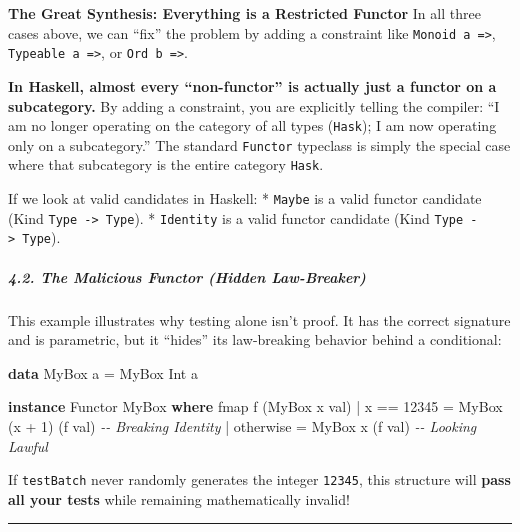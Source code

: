 \documentclass[
]{article}
\newenvironment{Shaded}{}{}
\newcommand{\CommentTok}[1]{\textcolor[rgb]{0.38,0.63,0.69}{\textit{#1}}}
\newcommand{\DataTypeTok}[1]{\textcolor[rgb]{0.56,0.13,0.00}{#1}}
\newcommand{\DecValTok}[1]{\textcolor[rgb]{0.25,0.63,0.44}{#1}}
\newcommand{\FunctionTok}[1]{\textcolor[rgb]{0.02,0.16,0.49}{#1}}
\newcommand{\KeywordTok}[1]{\textcolor[rgb]{0.00,0.44,0.13}{\textbf{#1}}}
\newcommand{\NormalTok}[1]{#1}
\newcommand{\OperatorTok}[1]{\textcolor[rgb]{0.40,0.40,0.40}{#1}}
\newcommand{\OtherTok}[1]{\textcolor[rgb]{0.00,0.44,0.13}{#1}}
\begin{document}
\textbf{The Great Synthesis: Everything is a Restricted Functor} In all
three cases above, we can ``fix'' the problem by adding a constraint
like \texttt{Monoid\ a\ =\textgreater{}},
\texttt{Typeable\ a\ =\textgreater{}}, or
\texttt{Ord\ b\ =\textgreater{}}.

\textbf{In Haskell, almost every ``non-functor'' is actually just a
functor on a subcategory.} By adding a constraint, you are explicitly
telling the compiler: ``I am no longer operating on the category of all
types (\texttt{Hask}); I am now operating only on a subcategory.'' The
standard \texttt{Functor} typeclass is simply the special case where
that subcategory is the entire category \texttt{Hask}.

If we look at valid candidates in Haskell: * \texttt{Maybe} is a valid
functor candidate (Kind \texttt{Type\ -\textgreater{}\ Type}). *
\texttt{Identity} is a valid functor candidate (Kind
\texttt{Type\ -\textgreater{}\ Type}).

\subparagraph{4.2. The Malicious Functor (Hidden
Law-Breaker)}\label{the-malicious-functor-hidden-law-breaker}

This example illustrates why testing alone isn't proof. It has the
correct signature and is parametric, but it ``hides'' its law-breaking
behavior behind a conditional:

\begin{Shaded}
\begin{Highlighting}[]
\KeywordTok{data} \DataTypeTok{MyBox}\NormalTok{ a }\OtherTok{=} \DataTypeTok{MyBox} \DataTypeTok{Int}\NormalTok{ a}

\KeywordTok{instance} \DataTypeTok{Functor} \DataTypeTok{MyBox} \KeywordTok{where}
    \FunctionTok{fmap}\NormalTok{ f (}\DataTypeTok{MyBox}\NormalTok{ x val) }
      \OperatorTok{|}\NormalTok{ x }\OperatorTok{==} \DecValTok{12345} \OtherTok{=} \DataTypeTok{MyBox}\NormalTok{ (x }\OperatorTok{+} \DecValTok{1}\NormalTok{) (f val) }\CommentTok{{-}{-} Breaking Identity}
      \OperatorTok{|} \FunctionTok{otherwise}  \OtherTok{=} \DataTypeTok{MyBox}\NormalTok{ x (f val)      }\CommentTok{{-}{-} Looking Lawful}
\end{Highlighting}
\end{Shaded}

If \texttt{testBatch} never randomly generates the integer
\texttt{12345}, this structure will \textbf{pass all your tests} while
remaining mathematically invalid!

\begin{center}\rule{0.5\linewidth}{0.5pt}\end{center}
\end{document}
